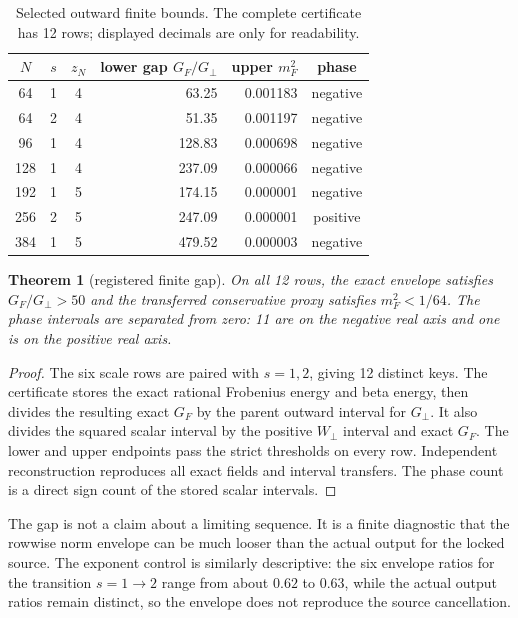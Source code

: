 \documentclass[11pt]{article}
\newcommand{\Gperp}{G_{\perp}}
\newcommand{\GF}{G_F}
\newcommand{\Wperp}{W_{\perp}}
\newcommand{\mF}{m_F}
\newtheorem{theorem}{Theorem}
\begin{document}
\begin{table}[t]
\centering
\scriptsize
\begin{tabular}{c c c r r c}
\toprule
 $N$ & $s$ & $z_N$ & lower gap $\GF/\Gperp$ & upper $\mF^2$ & phase\\
\midrule
 64  & 1 & 4 & 63.25 & 0.001183 & negative\\
 64  & 2 & 4 & 51.35 & 0.001197 & negative\\
 96  & 1 & 4 & 128.83 & 0.000698 & negative\\
 128 & 1 & 4 & 237.09 & 0.000066 & negative\\
 192 & 1 & 5 & 174.15 & 0.000001 & negative\\
 256 & 2 & 5 & 247.09 & 0.000001 & positive\\
 384 & 1 & 5 & 479.52 & 0.000003 & negative\\
\bottomrule
\end{tabular}
\caption{Selected outward finite bounds.  The complete certificate has 12
rows; displayed decimals are only for readability.}
\end{table}

\begin{theorem}[registered finite gap]
On all 12 rows, the exact envelope satisfies
\(\GF/\Gperp>50\) and the transferred conservative proxy satisfies
\(\mF^2<1/64\).  The phase intervals are separated from zero: 11 are on the
negative real axis and one is on the positive real axis.
\end{theorem}

\begin{proof}
The six scale rows are paired with \(s=1,2\), giving 12 distinct keys.  The
certificate stores the exact rational Frobenius energy and beta energy, then
divides the resulting exact \(\GF\) by the parent outward interval for
\(\Gperp\).  It also divides the squared scalar interval by the positive
\(\Wperp\) interval and exact \(\GF\).  The lower and upper endpoints pass the
strict thresholds on every row.  Independent reconstruction reproduces all
exact fields and interval transfers.  The phase count is a direct sign count
of the stored scalar intervals.
\end{proof}

The gap is not a claim about a limiting sequence.  It is a finite diagnostic
that the rowwise norm envelope can be much looser than the actual output for
the locked source.  The exponent control is similarly descriptive: the six
envelope ratios for the transition \(s=1\to2\) range from about \(0.62\) to
\(0.63\), while the actual output ratios remain distinct, so the envelope does
not reproduce the source cancellation.
\end{document}
